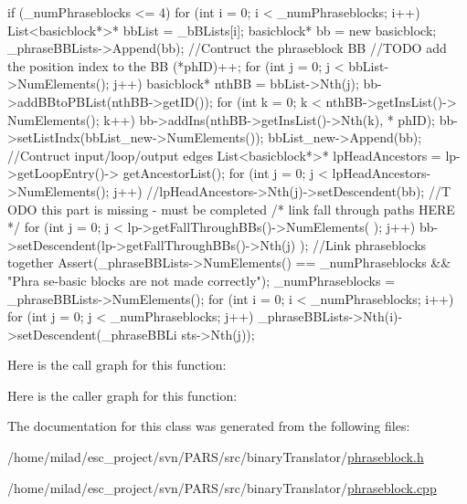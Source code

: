 \begin{DoxyCode}
                                                                                 
           {
        if (_numPhraseblocks <= 4) {
                for (int i = 0; i < _numPhraseblocks; i++) {
                        List<basicblock*>* bbList = _bBLists[i];
                        basicblock* bb = new basicblock;
                        _phraseBBLists->Append(bb);
                        //Contruct the phraseblock BB
                        //TODO add the position index to the BB
                        (*phID)++;
                        for (int j = 0; j < bbList->NumElements(); j++) {
                                basicblock* nthBB = bbList->Nth(j);
                                bb->addBBtoPBList(nthBB->getID());
                                for (int k = 0; k < nthBB->getInsList()->
      NumElements(); k++) {
                                        bb->addIns(nthBB->getInsList()->Nth(k), *
      phID);
                                }
                        }
                        bb->setListIndx(bbList_new->NumElements());
                        bbList_new->Append(bb);
                        //Contruct input/loop/output edges
                        List<basicblock*>* lpHeadAncestors = lp->getLoopEntry()->
      getAncestorList();
                        for (int j = 0; j < lpHeadAncestors->NumElements(); j++) 
      {
                                //lpHeadAncestors->Nth(j)->setDescendent(bb); //T
      ODO this part is missing - must be completed
                        }
                        /* link fall through paths HERE */
                        for (int j = 0; j < lp->getFallThroughBBs()->NumElements(
      ); j++) {
                                bb->setDescendent(lp->getFallThroughBBs()->Nth(j)
      );
                        }
                }
                //Link phraseblocks together
                Assert(_phraseBBLists->NumElements() == _numPhraseblocks && "Phra
      se-basic blocks are not made correctly");
                _numPhraseblocks = _phraseBBLists->NumElements();
                for (int i = 0; i < _numPhraseblocks; i++) {
                        for (int j = 0; j < _numPhraseblocks; j++) {
                                _phraseBBLists->Nth(i)->setDescendent(_phraseBBLi
      sts->Nth(j));
                        }
                }
        }
}\end{DoxyCode}


Here is the call graph for this function:




Here is the caller graph for this function:




The documentation for this class was generated from the following files:\begin{DoxyCompactItemize}
\item 
/home/milad/esc\_\-project/svn/PARS/src/binaryTranslator/\hyperlink{phraseblock_8h}{phraseblock.h}\item 
/home/milad/esc\_\-project/svn/PARS/src/binaryTranslator/\hyperlink{phraseblock_8cpp}{phraseblock.cpp}\end{DoxyCompactItemize}
